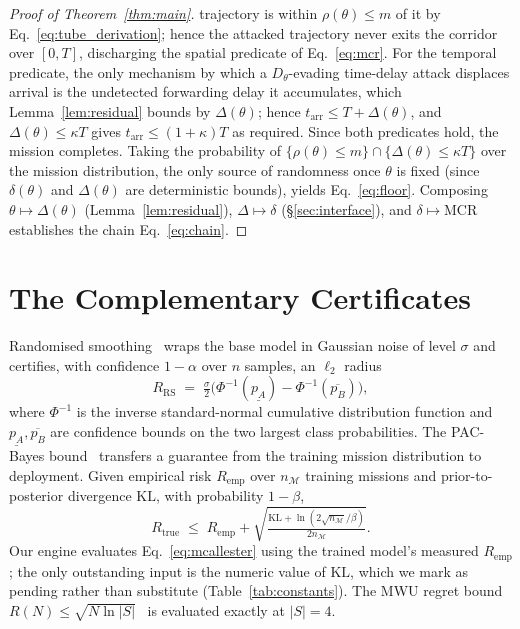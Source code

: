 \documentclass[conference,letterpaper,10pt]{IEEEtran}   %
\newcommand{\MCR}{\mathrm{MCR}}
\begin{document}
\begin{proof}[Proof of Theorem~\ref{thm:main}]
trajectory is within $\rho(\theta)\le m$ of it by
Eq.~\eqref{eq:tube_derivation}; hence the attacked trajectory never exits the
corridor over $[0,T]$, discharging the spatial predicate of
Eq.~\eqref{eq:mcr}. For the temporal predicate, the only mechanism by
which a $D_\theta$-evading time-delay attack displaces arrival is the undetected
forwarding delay it accumulates, which Lemma~\ref{lem:residual} bounds by
$\Delta(\theta)$; hence $t_{\mathrm{arr}}\le T+\Delta(\theta)$, and
$\Delta(\theta)\le\kappa T$ gives $t_{\mathrm{arr}}\le(1+\kappa)T$ as required.
Since both predicates hold, the mission completes. Taking the probability of
$\{\rho(\theta)\le m\}\cap\{\Delta(\theta)\le\kappa T\}$ over the mission
distribution, the only source of randomness once $\theta$ is fixed (since
$\delta(\theta)$ and $\Delta(\theta)$ are deterministic bounds), yields
Eq.~\eqref{eq:floor}. Composing
$\theta\!\mapsto\!\Delta(\theta)$ (Lemma~\ref{lem:residual}),
$\Delta\!\mapsto\!\delta$ (\S\ref{sec:interface}), and $\delta\!\mapsto\!\MCR$
establishes the chain Eq.~\eqref{eq:chain}.
\end{proof}


\section{The Complementary Certificates}
\label{app:certs}
Randomised smoothing~\cite{cohen2019smoothing} wraps the base model in
Gaussian noise of level $\sigma$ and certifies, with confidence $1-\alpha$ over
$n$ samples, an $\ell_2$ radius
\begin{equation}
\label{eq:cohen}
R_{\mathrm{RS}} \;=\; \tfrac{\sigma}{2}\big(\Phi^{-1}(\underline{p_A})-\Phi^{-1}(\overline{p_B})\big),
\end{equation}
where $\Phi^{-1}$ is the inverse standard-normal cumulative distribution
function and
$\underline{p_A},\overline{p_B}$ are confidence bounds on the two largest class
probabilities. The PAC-Bayes
bound~\cite{mcallester1999pac,viallard2021pacbayes} transfers a guarantee from
the training mission distribution to deployment. Given empirical risk
$R_{\mathrm{emp}}$ over $n_{\mathcal{M}}$ training missions and
prior-to-posterior divergence $\mathrm{KL}$, with probability $1-\beta$,
\begin{equation}
\label{eq:mcallester}
R_{\mathrm{true}} \;\le\; R_{\mathrm{emp}} + \sqrt{\tfrac{\mathrm{KL}+\ln(2\sqrt{n_{\mathcal{M}}}/\beta)}{2n_{\mathcal{M}}}}.
\end{equation}
Our engine evaluates Eq.~\eqref{eq:mcallester} using the trained model's
measured $R_{\mathrm{emp}}$; the only outstanding input is the numeric value of
$\mathrm{KL}$, which we mark as pending rather than substitute
(Table~\ref{tab:constants}). The MWU regret bound
$R(N)\le\sqrt{N\ln|S|}$~\cite{arora2012mwu,balcan2015commitment} is evaluated
exactly at $|S|=4$.
\end{document}
